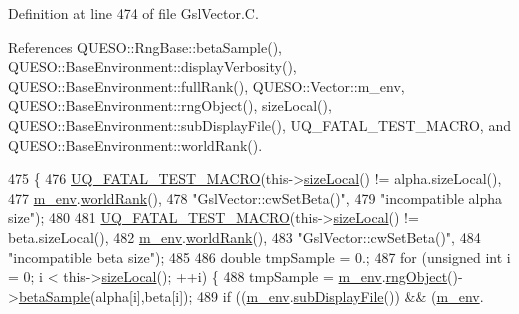 Definition at line 474 of file Gsl\-Vector.\-C.



References Q\-U\-E\-S\-O\-::\-Rng\-Base\-::beta\-Sample(), Q\-U\-E\-S\-O\-::\-Base\-Environment\-::display\-Verbosity(), Q\-U\-E\-S\-O\-::\-Base\-Environment\-::full\-Rank(), Q\-U\-E\-S\-O\-::\-Vector\-::m\-\_\-env, Q\-U\-E\-S\-O\-::\-Base\-Environment\-::rng\-Object(), size\-Local(), Q\-U\-E\-S\-O\-::\-Base\-Environment\-::sub\-Display\-File(), U\-Q\-\_\-\-F\-A\-T\-A\-L\-\_\-\-T\-E\-S\-T\-\_\-\-M\-A\-C\-R\-O, and Q\-U\-E\-S\-O\-::\-Base\-Environment\-::world\-Rank().


\begin{DoxyCode}
475 \{
476   \hyperlink{_defines_8h_a56d63d18d0a6d45757de47fcc06f574d}{UQ\_FATAL\_TEST\_MACRO}(this->\hyperlink{class_q_u_e_s_o_1_1_gsl_vector_ace6fb1739b7cf6456b3dcde84c766fb3}{sizeLocal}() != alpha.sizeLocal(),
477                       \hyperlink{class_q_u_e_s_o_1_1_vector_ae7615172bb1e54339151d3f3d71a0344}{m\_env}.\hyperlink{class_q_u_e_s_o_1_1_base_environment_a78b57112bbd0e6dd0e8afec00b40ffa7}{worldRank}(),
478                       \textcolor{stringliteral}{"GslVector::cwSetBeta()"},
479                       \textcolor{stringliteral}{"incompatible alpha size"});
480 
481   \hyperlink{_defines_8h_a56d63d18d0a6d45757de47fcc06f574d}{UQ\_FATAL\_TEST\_MACRO}(this->\hyperlink{class_q_u_e_s_o_1_1_gsl_vector_ace6fb1739b7cf6456b3dcde84c766fb3}{sizeLocal}() != beta.sizeLocal(),
482                       \hyperlink{class_q_u_e_s_o_1_1_vector_ae7615172bb1e54339151d3f3d71a0344}{m\_env}.\hyperlink{class_q_u_e_s_o_1_1_base_environment_a78b57112bbd0e6dd0e8afec00b40ffa7}{worldRank}(),
483                       \textcolor{stringliteral}{"GslVector::cwSetBeta()"},
484                       \textcolor{stringliteral}{"incompatible beta size"});
485 
486   \textcolor{keywordtype}{double} tmpSample = 0.;
487   \textcolor{keywordflow}{for} (\textcolor{keywordtype}{unsigned} \textcolor{keywordtype}{int} i = 0; i < this->\hyperlink{class_q_u_e_s_o_1_1_gsl_vector_ace6fb1739b7cf6456b3dcde84c766fb3}{sizeLocal}(); ++i) \{
488     tmpSample = \hyperlink{class_q_u_e_s_o_1_1_vector_ae7615172bb1e54339151d3f3d71a0344}{m\_env}.\hyperlink{class_q_u_e_s_o_1_1_base_environment_afc1f1258b770ac8e27cf308bbcd6a296}{rngObject}()->\hyperlink{class_q_u_e_s_o_1_1_rng_base_a098089a93e29db4ad9ac106c8b5de583}{betaSample}(alpha[i],beta[i]);
489     \textcolor{keywordflow}{if} ((\hyperlink{class_q_u_e_s_o_1_1_vector_ae7615172bb1e54339151d3f3d71a0344}{m\_env}.\hyperlink{class_q_u_e_s_o_1_1_base_environment_a8a0064746ae8dddfece4229b9ad374d6}{subDisplayFile}()) && (\hyperlink{class_q_u_e_s_o_1_1_vector_ae7615172bb1e54339151d3f3d71a0344}{m\_env}.

\end{DoxyCode}

